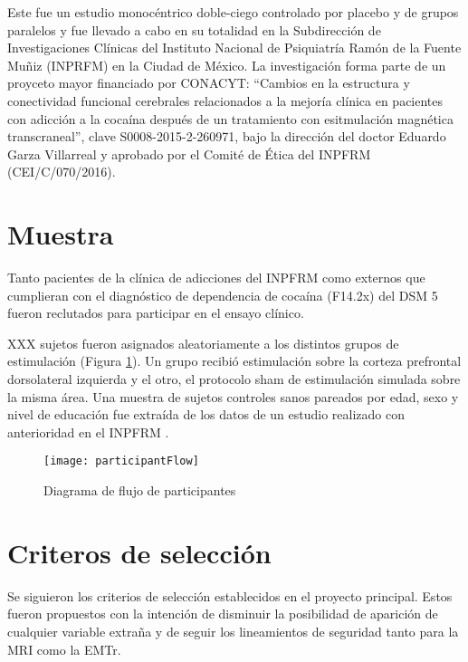 Este fue un estudio monocéntrico doble-ciego controlado por placebo y de grupos paralelos y fue llevado a cabo en su totalidad en la Subdirección de Investigaciones Clínicas del Instituto Nacional de Psiquiatría Ramón de la Fuente Muñiz (INPRFM) en la Ciudad de México.
La investigación forma parte de un proyceto mayor financiado por CONACYT:
``Cambios en la estructura y conectividad funcional cerebrales relacionados a la mejoría clínica en pacientes con adicción a la cocaína después de un tratamiento con esitmulación magnética transcraneal'',
clave S0008-2015-2-260971, bajo la dirección del doctor Eduardo Garza Villarreal y aprobado por el Comité de Ética del INPFRM (CEI/C/070/2016).

\section{Muestra}
Tanto pacientes de la clínica de adicciones del INPFRM como externos que cumplieran con el diagnóstico de dependencia de cocaína (F14.2x) del DSM 5 \parencite{APA2013} fueron reclutados para participar en el ensayo clínico.\par
XXX sujetos fueron asignados aleatoriamente a los distintos grupos de estimulación (Figura \ref{fig:flow}).
Un grupo recibió estimulación sobre la corteza prefrontal dorsolateral izquierda y el otro, el protocolo sham de estimulación simulada sobre la misma área.
Una muestra de sujetos controles sanos pareados por edad, sexo y nivel de educación fue extraída de los datos de un estudio realizado con anterioridad en el INPFRM \parencite{Garza2017}.

\begin{figure}[H]
    \centering
    \texttt{[image: participantFlow]}
    \caption{Diagrama de flujo de participantes}
    \label{fig:flow}
\end{figure}

\section{Criteros de selección}
Se siguieron los criterios de selección establecidos en el proyecto principal.
Estos fueron propuestos con la intención de disminuir la posibilidad de aparición de cualquier variable extraña y de seguir los lineamientos de seguridad tanto para la MRI como la EMTr.

